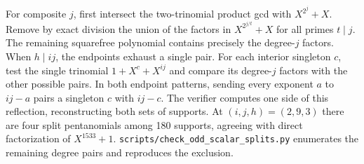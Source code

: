 \documentclass[11pt]{article}
\begin{document}
For composite \(j\), first intersect the two-trinomial product gcd
with \(X^{2^j}+X\). Remove by exact division the union of the factors
in \(X^{2^{j/t}}+X\) for all primes \(t\mid j\). The remaining
squarefree polynomial contains precisely the degree-\(j\) factors.
When \(h\mid ij\), the endpoints exhaust a single pair. For each
interior singleton \(c\), test the single trinomial \(1+X^c+X^{ij}\)
and compare its degree-\(j\) factors with the other possible pairs.
In both endpoint patterns, sending every exponent \(a\) to \(ij-a\)
pairs a singleton \(c\) with \(ij-c\). The verifier computes one
side of this reflection, reconstructing both sets of supports.
At \((i,j,h)=(2,9,3)\) there are four split pentanomials among 180
supports, agreeing with direct factorization of \(X^{1533}+1\).
\nolinkurl{scripts/check_odd_scalar_splits.py} enumerates the
remaining degree pairs and reproduces the exclusion.
\end{document}
